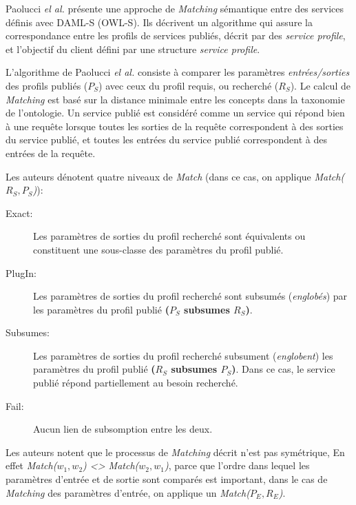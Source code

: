    Paolucci \emph{el al.} \cite{paolucci2002semantic} présente une
    approche de \textit{Matching} sémantique entre des services
    définis avec \textsc{DAML-S} (\textsc{OWL-S}). Ils
    décrivent un algorithme qui assure la correspondance entre les
    profils de services publiés, décrit par des \textit{service
      profile}, et l'objectif du client défini par une structure
    \textit{service profile}.\medskip

    L'algorithme de Paolucci \emph{el al.} consiste à comparer les paramètres
    \textit{entrées/sorties} des profils publiés ($P_S$) avec ceux du
    profil requis, ou recherché ($R_S$). Le calcul de
    \textit{Matching} est basé sur la distance minimale entre les
    concepts dans la taxonomie de l'ontologie. Un service publié est
    considéré comme un service qui répond bien à une requête lorsque
    toutes les sorties de la requête correspondent à des sorties du
    service publié, et toutes les entrées du service publié
    correspondent à des entrées de la requête.\medskip

    Les auteurs dénotent quatre niveaux de \textit{Match} (dans ce cas,
    on applique \textit{Match($R_S, P_S$)}):

    \renewcommand{\descriptionlabel}[1]{\hspace{1cm}--~\textsf{#1}}
    \begin{description}
    \item [Exact:] Les paramètres de sorties du profil recherché sont
      équivalents ou constituent une sous-classe des paramètres du
      profil publié.

    \item [PlugIn:] Les paramètres de sorties du profil recherché sont
      subsumés (\textit{englobés}) par les paramètres du profil publié
      \textbf{($P_S$ subsumes $R_S$)}.

    \item [Subsumes:] Les paramètres de sorties du profil recherché
      subsument (\textit{englobent}) les paramètres du
      profil publié \textbf{($R_S$ subsumes $P_S$)}. Dans ce cas, le
      service publié répond partiellement au besoin recherché.

    \item [Fail:] Aucun lien de subsomption entre les deux.
    \end{description}
    \enddescription

    Les auteurs notent que le processus de \textit{Matching} décrit
    n'est pas symétrique, En effet \textit{Match($w_1, w_2$) <>
      Match($w_2, w_1$)}, parce que l'ordre dans lequel les paramètres
    d'entrée et de sortie sont comparés est important, dans le cas de
    \textit{Matching} des paramètres d'entrée, on applique un
    \textit{Match($P_E, R_E$)}.\bigskip

